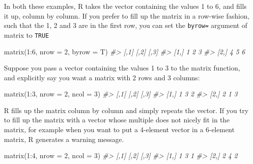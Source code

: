 \documentclass[
]{book}
\newenvironment{Shaded}{\begin{snugshade}}{\end{snugshade}}
\newcommand{\AttributeTok}[1]{\textcolor[rgb]{0.77,0.63,0.00}{#1}}
\newcommand{\CommentTok}[1]{\textcolor[rgb]{0.56,0.35,0.01}{\textit{#1}}}
\newcommand{\DecValTok}[1]{\textcolor[rgb]{0.00,0.00,0.81}{#1}}
\newcommand{\FunctionTok}[1]{\textcolor[rgb]{0.00,0.00,0.00}{#1}}
\newcommand{\NormalTok}[1]{#1}
\newcommand{\SpecialCharTok}[1]{\textcolor[rgb]{0.00,0.00,0.00}{#1}}
\begin{document}
In both these examples, R takes the vector containing the values 1 to 6, and fills it up, column by column. If you prefer to fill up the matrix in a row-wise fashion, such that the 1, 2 and 3 are in the first row, you can set the \texttt{byrow=} argument of matrix to \texttt{TRUE}

\begin{Shaded}
\begin{Highlighting}[]
\FunctionTok{matrix}\NormalTok{(}\DecValTok{1}\SpecialCharTok{:}\DecValTok{6}\NormalTok{, }\AttributeTok{nrow =} \DecValTok{2}\NormalTok{, }\AttributeTok{byrow =}\NormalTok{ T)}
\CommentTok{\#\textgreater{}      [,1] [,2] [,3]}
\CommentTok{\#\textgreater{} [1,]    1    2    3}
\CommentTok{\#\textgreater{} [2,]    4    5    6}
\end{Highlighting}
\end{Shaded}

Suppose you pass a vector containing the values 1 to 3 to the matrix function, and explicitly say you want a matrix with 2 rows and 3 columns:

\begin{Shaded}
\begin{Highlighting}[]
\FunctionTok{matrix}\NormalTok{(}\DecValTok{1}\SpecialCharTok{:}\DecValTok{3}\NormalTok{, }\AttributeTok{nrow =} \DecValTok{2}\NormalTok{, }\AttributeTok{ncol =} \DecValTok{3}\NormalTok{)}
\CommentTok{\#\textgreater{}      [,1] [,2] [,3]}
\CommentTok{\#\textgreater{} [1,]    1    3    2}
\CommentTok{\#\textgreater{} [2,]    2    1    3}
\end{Highlighting}
\end{Shaded}

R fills up the matrix column by column and simply repeats the vector. If you try to fill up the matrix with a vector whose multiple does not nicely fit in the matrix, for example when you want to put a 4-element vector in a 6-element matrix, R generates a warning message.

\begin{Shaded}
\begin{Highlighting}[]
\FunctionTok{matrix}\NormalTok{(}\DecValTok{1}\SpecialCharTok{:}\DecValTok{4}\NormalTok{, }\AttributeTok{nrow =} \DecValTok{2}\NormalTok{, }\AttributeTok{ncol =} \DecValTok{3}\NormalTok{)}
\CommentTok{\#\textgreater{}      [,1] [,2] [,3]}
\CommentTok{\#\textgreater{} [1,]    1    3    1}
\CommentTok{\#\textgreater{} [2,]    2    4    2}
\end{Highlighting}
\end{Shaded}
\end{document}

